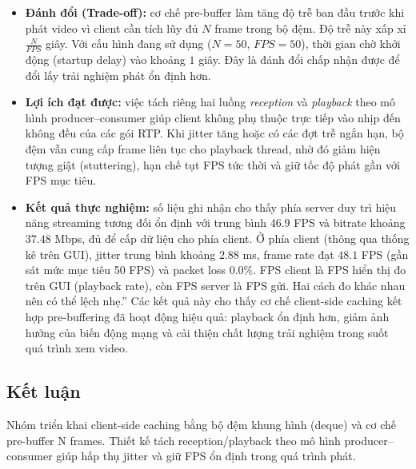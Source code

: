 \begin{itemize}
    \item \textbf{Đánh đổi (Trade-off):} cơ chế pre-buffer làm tăng độ trễ ban đầu trước khi phát video vì client cần tích lũy đủ $N$ frame trong bộ đệm. Độ trễ này xấp xỉ $\frac{N}{FPS}$ giây. Với cấu hình đang sử dụng ($N=50$, $FPS=50$), thời gian chờ khởi động (startup delay) vào khoảng $1$ giây. Đây là đánh đổi chấp nhận được để đổi lấy trải nghiệm phát ổn định hơn.
    
    \item \textbf{Lợi ích đạt được:} việc tách riêng hai luồng \textit{reception} và \textit{playback} theo mô hình producer--consumer giúp client không phụ thuộc trực tiếp vào nhịp đến không đều của các gói RTP. Khi jitter tăng hoặc có các đợt trễ ngắn hạn, bộ đệm vẫn cung cấp frame liên tục cho playback thread, nhờ đó giảm hiện tượng giật (stuttering), hạn chế tụt FPS tức thời và giữ tốc độ phát gần với FPS mục tiêu.
    
    \item \textbf{Kết quả thực nghiệm:} số liệu ghi nhận cho thấy phía server duy trì hiệu năng streaming tương đối ổn định với trung bình $46.9$ FPS và bitrate khoảng $37.48$ Mbps, đủ để cấp dữ liệu cho phía client. Ở phía client (thông qua thống kê trên GUI), jitter trung bình khoảng $2.88$ ms, frame rate đạt $48.1$ FPS (gần sát mức mục tiêu 50 FPS) và packet loss $0.0\%$. FPS client là FPS hiển thị đo trên GUI (playback rate), còn FPS server là FPS gửi. Hai cách đo khác nhau nên có thể lệch nhẹ.” Các kết quả này cho thấy cơ chế client-side caching kết hợp pre-buffering đã hoạt động hiệu quả: playback ổn định hơn, giảm ảnh hưởng của biến động mạng và cải thiện chất lượng trải nghiệm trong suốt quá trình xem video. 
\end{itemize}

\subsection{Kết luận}
Nhóm triển khai client-side caching bằng bộ đệm khung hình (deque) và cơ chế pre-buffer N frames.
Thiết kế tách reception/playback theo mô hình producer--consumer giúp hấp thụ jitter và giữ FPS ổn định trong quá trình phát.

\newpage